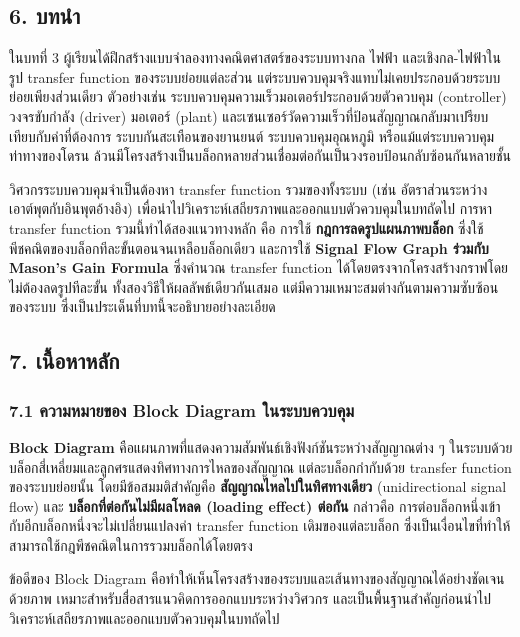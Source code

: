 \subsection{6. บทนำ}

ในบทที่ 3 ผู้เรียนได้ฝึกสร้างแบบจำลองทางคณิตศาสตร์ของระบบทางกล ไฟฟ้า และเชิงกล-ไฟฟ้าในรูป transfer function ของระบบย่อยแต่ละส่วน แต่ระบบควบคุมจริงแทบไม่เคยประกอบด้วยระบบย่อยเพียงส่วนเดียว ตัวอย่างเช่น ระบบควบคุมความเร็วมอเตอร์ประกอบด้วยตัวควบคุม (controller) วงจรขับกำลัง (driver) มอเตอร์ (plant) และเซนเซอร์วัดความเร็วที่ป้อนสัญญาณกลับมาเปรียบเทียบกับค่าที่ต้องการ ระบบกันสะเทือนของยานยนต์ ระบบควบคุมอุณหภูมิ หรือแม้แต่ระบบควบคุมท่าทางของโดรน ล้วนมีโครงสร้างเป็นบล็อกหลายส่วนเชื่อมต่อกันเป็นวงรอบป้อนกลับซ้อนกันหลายชั้น

วิศวกรระบบควบคุมจำเป็นต้องหา transfer function รวมของทั้งระบบ (เช่น อัตราส่วนระหว่างเอาต์พุตกับอินพุตอ้างอิง) เพื่อนำไปวิเคราะห์เสถียรภาพและออกแบบตัวควบคุมในบทถัดไป การหา transfer function รวมนี้ทำได้สองแนวทางหลัก คือ การใช้ \textbf{กฎการลดรูปแผนภาพบล็อก} ซึ่งใช้พีชคณิตของบล็อกทีละขั้นตอนจนเหลือบล็อกเดียว และการใช้ \textbf{Signal Flow Graph ร่วมกับ Mason's Gain Formula} ซึ่งคำนวณ transfer function ได้โดยตรงจากโครงสร้างกราฟโดยไม่ต้องลดรูปทีละขั้น ทั้งสองวิธีให้ผลลัพธ์เดียวกันเสมอ แต่มีความเหมาะสมต่างกันตามความซับซ้อนของระบบ ซึ่งเป็นประเด็นที่บทนี้จะอธิบายอย่างละเอียด


\subsection{7. เนื้อหาหลัก}

\subsubsection{7.1 ความหมายของ Block Diagram ในระบบควบคุม}

\textbf{Block Diagram} คือแผนภาพที่แสดงความสัมพันธ์เชิงฟังก์ชันระหว่างสัญญาณต่าง ๆ ในระบบด้วยบล็อกสี่เหลี่ยมและลูกศรแสดงทิศทางการไหลของสัญญาณ แต่ละบล็อกกำกับด้วย transfer function ของระบบย่อยนั้น โดยมีข้อสมมติสำคัญคือ \textbf{สัญญาณไหลไปในทิศทางเดียว} (unidirectional signal flow) และ \textbf{บล็อกที่ต่อกันไม่มีผลโหลด (loading effect) ต่อกัน} กล่าวคือ การต่อบล็อกหนึ่งเข้ากับอีกบล็อกหนึ่งจะไม่เปลี่ยนแปลงค่า transfer function เดิมของแต่ละบล็อก ซึ่งเป็นเงื่อนไขที่ทำให้สามารถใช้กฎพีชคณิตในการรวมบล็อกได้โดยตรง

ข้อดีของ Block Diagram คือทำให้เห็นโครงสร้างของระบบและเส้นทางของสัญญาณได้อย่างชัดเจนด้วยภาพ เหมาะสำหรับสื่อสารแนวคิดการออกแบบระหว่างวิศวกร และเป็นพื้นฐานสำคัญก่อนนำไปวิเคราะห์เสถียรภาพและออกแบบตัวควบคุมในบทถัดไป

